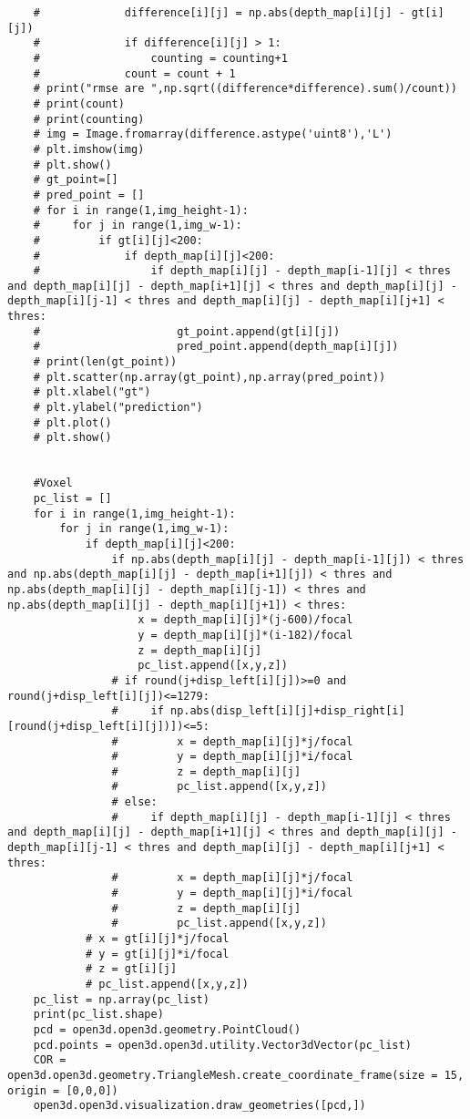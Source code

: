 \begin{verbatim}
    #             difference[i][j] = np.abs(depth_map[i][j] - gt[i][j])
    #             if difference[i][j] > 1:
    #                 counting = counting+1
    #             count = count + 1
    # print("rmse are ",np.sqrt((difference*difference).sum()/count))
    # print(count)
    # print(counting)
    # img = Image.fromarray(difference.astype('uint8'),'L')
    # plt.imshow(img)
    # plt.show()
    # gt_point=[]
    # pred_point = []
    # for i in range(1,img_height-1):
    #     for j in range(1,img_w-1):
    #         if gt[i][j]<200:
    #             if depth_map[i][j]<200:
    #                 if depth_map[i][j] - depth_map[i-1][j] < thres and depth_map[i][j] - depth_map[i+1][j] < thres and depth_map[i][j] - depth_map[i][j-1] < thres and depth_map[i][j] - depth_map[i][j+1] < thres:
    #                     gt_point.append(gt[i][j])
    #                     pred_point.append(depth_map[i][j])
    # print(len(gt_point))
    # plt.scatter(np.array(gt_point),np.array(pred_point))
    # plt.xlabel("gt")
    # plt.ylabel("prediction")
    # plt.plot()
    # plt.show()


    #Voxel
    pc_list = []
    for i in range(1,img_height-1):
        for j in range(1,img_w-1):
            if depth_map[i][j]<200:
                if np.abs(depth_map[i][j] - depth_map[i-1][j]) < thres and np.abs(depth_map[i][j] - depth_map[i+1][j]) < thres and np.abs(depth_map[i][j] - depth_map[i][j-1]) < thres and np.abs(depth_map[i][j] - depth_map[i][j+1]) < thres:
                    x = depth_map[i][j]*(j-600)/focal
                    y = depth_map[i][j]*(i-182)/focal
                    z = depth_map[i][j]
                    pc_list.append([x,y,z])
                # if round(j+disp_left[i][j])>=0 and round(j+disp_left[i][j])<=1279:
                #     if np.abs(disp_left[i][j]+disp_right[i][round(j+disp_left[i][j])])<=5:
                #         x = depth_map[i][j]*j/focal
                #         y = depth_map[i][j]*i/focal
                #         z = depth_map[i][j]
                #         pc_list.append([x,y,z])
                # else:
                #     if depth_map[i][j] - depth_map[i-1][j] < thres and depth_map[i][j] - depth_map[i+1][j] < thres and depth_map[i][j] - depth_map[i][j-1] < thres and depth_map[i][j] - depth_map[i][j+1] < thres:
                #         x = depth_map[i][j]*j/focal
                #         y = depth_map[i][j]*i/focal
                #         z = depth_map[i][j]
                #         pc_list.append([x,y,z])
            # x = gt[i][j]*j/focal
            # y = gt[i][j]*i/focal
            # z = gt[i][j]
            # pc_list.append([x,y,z])
    pc_list = np.array(pc_list)
    print(pc_list.shape)
    pcd = open3d.open3d.geometry.PointCloud()
    pcd.points = open3d.open3d.utility.Vector3dVector(pc_list)
    COR = open3d.open3d.geometry.TriangleMesh.create_coordinate_frame(size = 15, origin = [0,0,0])
    open3d.open3d.visualization.draw_geometries([pcd,])


\end{verbatim}
\newpage
